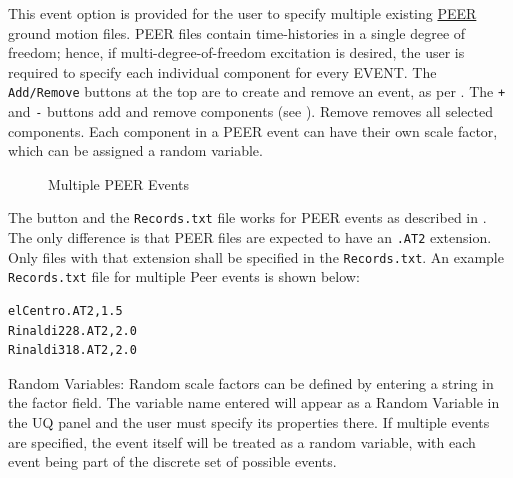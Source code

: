 This event option is provided for the user to specify multiple existing
\href{http://peer.berkeley.edu}{PEER} ground
motion files. PEER files contain time-histories in a single degree of freedom; hence, if multi-degree-of-freedom excitation is desired, the user is required to specify each
individual component for every EVENT. The \texttt{Add/Remove} buttons
at the top are to create and remove an event, as
per . The \texttt{+} and \texttt{-} buttons add and remove
components (see ). Remove removes all selected components. Each
component in a PEER event can have their own scale factor, which can be assigned a random variable.

\begin{figure}[!htbp]
  \caption{Multiple PEER Events}
  \label{fig:PEER_event_panel}
\end{figure}

The  button and the \texttt{Records.txt} file works for PEER events as described in . The only difference is that PEER files are expected to have an \texttt{.AT2} extension. Only files with that extension shall be specified in the \texttt{Records.txt}.
An example \texttt{Records.txt} file for multiple Peer
events is shown below:

\begin{verbatim}
elCentro.AT2,1.5
Rinaldi228.AT2,2.0
Rinaldi318.AT2,2.0
\end{verbatim}

Random Variables: Random scale factors can be defined by entering a string in the factor field. The variable name entered will appear as a Random Variable in the UQ panel and the user must specify its properties there. If multiple
events are specified, the event itself will be treated as a random
variable, with each event being part of the discrete set of possible
events.